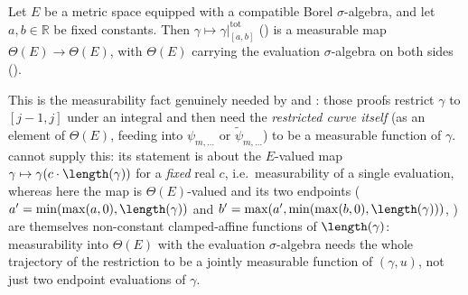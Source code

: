 \begin{helper}
  Let $E$ be a metric space equipped with a compatible Borel $\sigma$-algebra, and let
  $a,b \in \mathbb{R}$ be fixed constants. Then $\gamma \mapsto \gamma|^{\mathrm{tot}}_{[a,b]}$
  () is a measurable map $\Theta(E) \to \Theta(E)$, with $\Theta(E)$
  carrying the evaluation $\sigma$-algebra on both sides ().

  This is the measurability fact genuinely needed by  and
  : those proofs restrict $\gamma$ to $[j-1,j]$ under an integral and then
  need the \emph{restricted curve itself} (as an element of $\Theta(E)$, feeding into $\psi_{m,\dots}$
  or $\tilde\psi_{m,\dots}$) to be a measurable function of $\gamma$. 
  cannot supply this: its statement is about the $E$-valued map $\gamma \mapsto \gamma(c\cdot\length(\gamma))$
  for a \emph{fixed} real $c$, i.e.\ measurability of a single evaluation, whereas here the map is
  $\Theta(E)$-valued and its two endpoints ($a' = \min(\max(a,0),\length(\gamma))$ and
  $b' = \max(a',\min(\max(b,0),\length(\gamma)))$, ) are themselves
  non-constant clamped-affine functions of $\length(\gamma)$: measurability into
  $\Theta(E)$ with the evaluation $\sigma$-algebra needs the whole trajectory of the restriction to be
  a jointly measurable function of $(\gamma,u)$, not just two endpoint evaluations of $\gamma$.
\end{helper}
